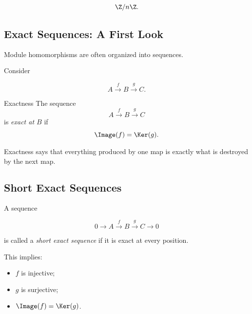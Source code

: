 \[ \Z/n\Z. \]

\subsection{Exact Sequences: A First Look}
\label{subsec:module-exact-sequences}

Module homomorphisms are often organized into sequences.

Consider

\[ A\xrightarrow{f}B\xrightarrow{g}C. \]

\begin{definitionbox}{Exactness}
The sequence
\[ A\xrightarrow{f}B\xrightarrow{g}C \]
is \emph{exact at \(B\)} if
\[ \Image(f)=\Ker(g). \]
\end{definitionbox}

Exactness says that everything produced by one map is exactly what is
destroyed by the next map.

\subsection{Short Exact Sequences}
\label{subsec:short-exact-sequences}

A sequence

\[ 0\longrightarrow A\xrightarrow{f}B\xrightarrow{g}C\longrightarrow0 \]

is called a \emph{short exact sequence} if it is exact at every position.

This implies:

\begin{itemize}
    \item \(f\) is injective;
    \item \(g\) is surjective;
    \item \(\Image(f)=\Ker(g)\).
\end{itemize}

\begin{center}
\end{center}

